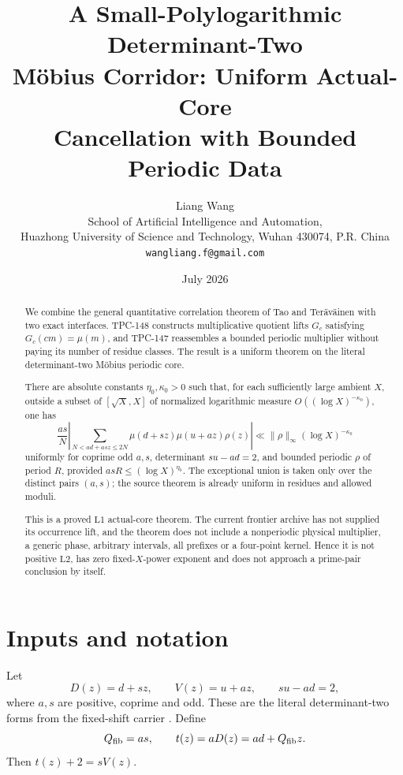 \documentclass[11pt]{article}
\title{\textbf{A Small-Polylogarithmic Determinant-Two}\\
\textbf{M\"obius Corridor: Uniform Actual-Core}\\
\textbf{Cancellation with Bounded Periodic Data}}
\author{Liang Wang\\
School of Artificial Intelligence and Automation,\\
Huazhong University of Science and Technology, Wuhan 430074, P.R. China\\
\texttt{wangliang.f@gmail.com}}
\date{July 2026}
\theoremstyle{definition}
\theoremstyle{remark}
\newcommand{\Lone}{\mathrm{L1}}
\newcommand{\Ltwo}{\mathrm{L2}}
\begin{document}
\maketitle

\begin{abstract}
We combine the general quantitative correlation theorem of Tao and
Ter\"av\"ainen with two exact interfaces.  TPC-148 constructs
multiplicative quotient lifts \(G_c\) satisfying
\(G_c(cm)=\mu(m)\), and TPC-147 reassembles a bounded periodic
multiplier without paying its number of residue classes.  The result
is a uniform theorem on the literal determinant-two M\"obius
periodic core.

There are absolute constants \(\eta_0,\kappa_0>0\) such that, for
each sufficiently large ambient \(X\), outside a subset of
\([\sqrt X,X]\) of normalized
logarithmic measure \(O((\log X)^{-\kappa_0})\), one has
\[
 \frac{as}{N}
 \left|
 \sum_{N<ad+asz\le2N}
 \mu(d+sz)\mu(u+az)\rho(z)
 \right|
 \ll\|\rho\|_\infty(\log X)^{-\kappa_0}
\]
uniformly for coprime odd \(a,s\), determinant \(su-ad=2\), and
bounded periodic \(\rho\) of period \(R\), provided
\(asR\le(\log X)^{\eta_0}\).  The exceptional union is taken only
over the distinct pairs \((a,s)\); the source theorem is already
uniform in residues and allowed moduli.

This is a proved \(\Lone\) actual-core theorem.  The current frontier
archive has not supplied its occurrence lift, and the theorem does
not include a nonperiodic physical multiplier, a generic phase,
arbitrary intervals, all prefixes or a four-point kernel.  Hence it
is not positive \(\Ltwo\), has zero fixed-\(X\)-power exponent and
does not approach a prime-pair conclusion by itself.
\end{abstract}

\section{Inputs and notation}

Let
\begin{equation}
 D(z)=d+sz,\qquad V(z)=u+az,\qquad su-ad=2,
\label{eq:fiber}
\end{equation}
where \(a,s\) are positive, coprime and odd.  These are the literal
determinant-two forms from the fixed-shift carrier
\citep{WangTPC127}.  Define
\begin{equation}
 Q_{\rm fib}=as,\qquad t(z)=aD(z)=ad+Q_{\rm fib}z.
\label{eq:t}
\end{equation}
Then \(t(z)+2=sV(z)\).
\end{document}
